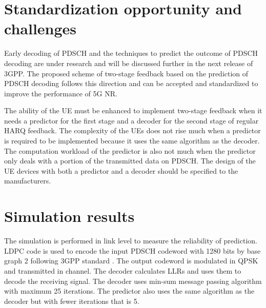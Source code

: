 \documentclass[conference]{IEEEtran}
\begin{document}
\section{Standardization opportunity and challenges}

Early decoding of PDSCH and the techniques to predict the outcome of PDSCH decoding are under research and will be discussed further in the next release of 3GPP. The proposed scheme of two-stage feedback based on the prediction of PDSCH decoding follows this direction and can be accepted and standardized to improve the performance of 5G NR.

The ability of the UE must be enhanced to implement two-stage feedback when it needs a predictor for the first stage and a decoder for the second stage of regular HARQ feedback. The complexity of the UEs does not rise much when a predictor is required to be implemented because it uses the same algorithm as the decoder. The computation workload of the predictor is also not much when the predictor only deals with a portion of the transmitted data on PDSCH. The design of the UE devices with both a predictor and a decoder should be specified to the manufacturers.  

\section{Simulation results} \label{VV}
The simulation is performed in link level to measure the reliability of prediction. LDPC code is used to encode the input PDSCH codeword with 1280 bits by base graph 2 following 3GPP standard \cite{b8}. The output codeword is modulated in QPSK and transmitted in channel. The decoder calculates LLRs and uses them to decode the receiving signal. The decoder uses min-sum message passing algorithm with maximum 25 iterations. The predictor also uses the same algorithm as the decoder but with fewer iterations that is 5.
\end{document}
